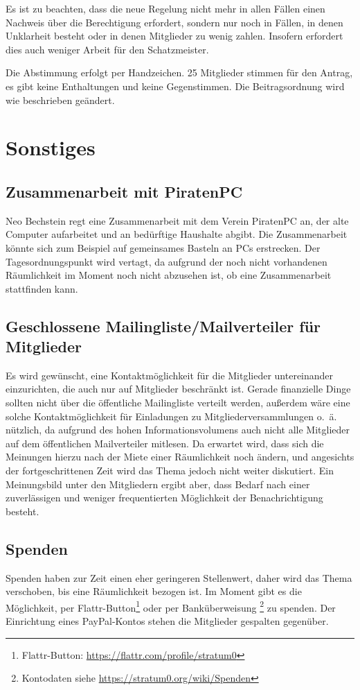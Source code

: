 \documentclass[a4paper,12pt]{scrartcl}
\begin{document}
Es ist zu beachten, dass die neue Regelung nicht mehr in allen Fällen einen
Nachweis über die Berechtigung erfordert, sondern nur noch in Fällen, in denen
Unklarheit besteht oder in denen Mitglieder zu wenig zahlen. Insofern erfordert
dies auch weniger Arbeit für den Schatzmeister.

Die Abstimmung erfolgt per Handzeichen. 25 Mitglieder stimmen für den Antrag, es
gibt keine Enthaltungen und keine Gegenstimmen. Die Beitragsordnung wird wie
beschrieben geändert.\useFN\FNUrlBeitrO


\section{Sonstiges}
\subsection{Zusammenarbeit mit PiratenPC}
\postponed
Neo Bechstein regt eine Zusammenarbeit mit dem Verein PiratenPC an, der alte
Computer aufarbeitet und an bedürftige Haushalte abgibt. Die Zusammenarbeit
könnte sich zum Beispiel auf gemeinsames Basteln an PCs erstrecken. Der
Tagesordnungspunkt wird vertagt, da aufgrund der noch nicht vorhandenen
Räumlichkeit im Moment noch nicht abzusehen ist, ob eine Zusammenarbeit
stattfinden kann.

\subsection{Geschlossene Mailingliste/Mailverteiler für Mitglieder}
\postponed
Es wird gewünscht, eine Kontaktmöglichkeit für die Mitglieder untereinander
einzurichten, die auch nur auf Mitglieder beschränkt ist. Gerade finanzielle
Dinge sollten nicht über die öffentliche Mailingliste verteilt werden, außerdem
wäre eine solche Kontaktmöglichkeit für Einladungen zu Mitgliederversammlungen
o.~ä. nützlich, da aufgrund des hohen Informationsvolumens auch nicht alle
Mitglieder auf dem öffentlichen Mailverteiler mitlesen. Da erwartet wird, dass
sich die Meinungen hierzu nach der Miete einer Räumlichkeit noch ändern, und
angesichts der fortgeschrittenen Zeit wird das Thema jedoch nicht weiter
diskutiert. Ein Meinungsbild unter den Mitgliedern ergibt aber, dass Bedarf nach
einer zuverlässigen und weniger frequentierten Möglichkeit der Benachrichtigung
besteht.

\subsection{Spenden}
\postponed
Spenden haben zur Zeit einen eher geringeren Stellenwert, daher wird das Thema
verschoben, bis eine Räumlichkeit bezogen ist. Im Moment gibt es die
Möglichkeit, per Flattr-Button\footnote{Flattr-Button:
\url{https://flattr.com/profile/stratum0}} oder per Banküberweisung%
\footnote{Kontodaten siehe \url{https://stratum0.org/wiki/Spenden}} zu spenden.
Der Einrichtung eines PayPal-Kontos stehen die Mitglieder gespalten gegenüber.
\end{document}
